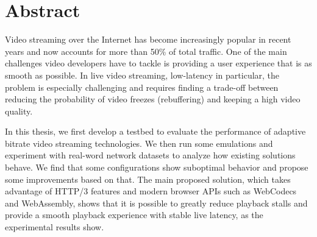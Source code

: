 \chapter*{Abstract} %
\label{abtract}


Video streaming over the Internet has become increasingly popular in recent years and now accounts for more than 50\% of total traffic. One of the main challenges video developers have to tackle is providing a user experience that is as smooth as possible. In live video streaming, low-latency in particular, the problem is especially challenging and requires finding a trade-off between reducing the probability of video freezes (rebuffering) and keeping a high video quality.

In this thesis, we first develop a testbed to evaluate the performance of adaptive bitrate video streaming technologies. We then run some emulations and experiment with real-word network datasets to analyze how existing solutions behave. We find that some configurations show suboptimal behavior and propose some improvements based on that. The main proposed solution, which takes advantage of HTTP/3 features and modern browser APIs such as WebCodecs and WebAssembly, shows that it is possible to greatly reduce playback stalls and provide a smooth playback experience with stable live latency, as the experimental results show.

\newpage
